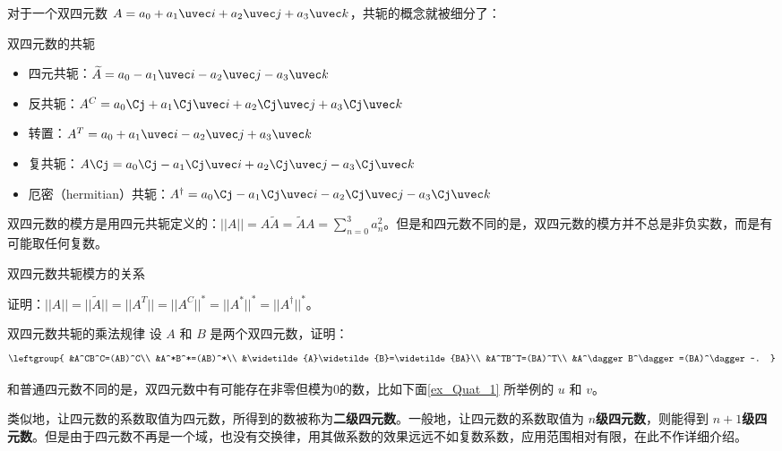 对于一个双四元数 $A=a_0+a_1 \uvec i+a_2\uvec j+a_3\uvec k$，共轭的概念就被细分了：

\begin{definition}{双四元数的共轭}
\begin{itemize}
\item 四元共轭：$\widetilde{A}=a_0-a_1\uvec i-a_2\uvec j-a_3\uvec k$
\item 反共轭：$A^C=a_0\Cj + a_1\Cj\uvec i+a_2\Cj\uvec j+a_3\Cj\uvec k$
\item 转置：$A^T=a_0+a_1\uvec i-a_2\uvec j+a_3\uvec k$
\item 复共轭：$A\Cj=a_0\Cj-a_1\Cj\uvec i+a_2\Cj\uvec j-a_3\Cj\uvec k$
\item 厄密（hermitian）共轭：$A^\dagger=a_0\Cj-a_1\Cj\uvec i-a_2\Cj\uvec j-a_3\Cj\uvec k$
\end{itemize}
\end{definition}

双四元数的模方是用四元共轭定义的：$||A||=A\widetilde{A}=\widetilde{A}A=\sum^{3}_{n=0}a^2_n$。但是和四元数不同的是，双四元数的模方并不总是非负实数，而是有可能取任何复数。

\begin{exercise}{双四元数共轭模方的关系}

证明：$||A||=||\widetilde{A}||=||A^T||=||A^C||^*=||A^*||^*=||A^\dagger||^*$。

\end{exercise}

\begin{exercise}{双四元数共轭的乘法规律}
设 $A$ 和 $B$ 是两个双四元数，证明：
\begin{equation}
\leftgroup{
&A^CB^C=(AB)^C\\
&A^*B^*=(AB)^*\\
&\widetilde{A}\widetilde{B}=\widetilde{BA}\\
&A^TB^T=(BA)^T\\
&A^\dagger B^\dagger=(BA)^\dagger~.
}
\end{equation}

\end{exercise}

和普通四元数不同的是，双四元数中有可能存在非零但模为0的数，比如下面\autoref{ex_Quat_1} 所举例的 $u$ 和 $v$。

类似地，让四元数的系数取值为四元数，所得到的数被称为\textbf{二级四元数}。一般地，让四元数的系数取值为 $n$\textbf{级四元数}，则能得到 $n+1$\textbf{级四元数}。但是由于四元数不再是一个域，也没有交换律，用其做系数的效果远远不如复数系数，应用范围相对有限，在此不作详细介绍。


